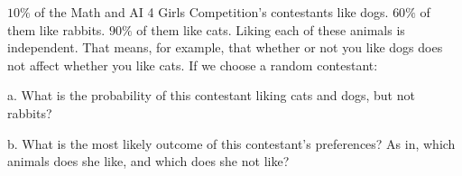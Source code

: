 $10\%$ of the Math and AI 4 Girls Competition's contestants like dogs. $60\%$ of them like rabbits. $90\%$ of them like cats. Liking each of these animals is independent. That means, for example, that whether or not you like dogs does not affect whether you like cats. If we choose a random contestant:

a. What is the probability of this contestant liking cats and dogs, but not rabbits?

b. What is the most likely outcome of this contestant's preferences? As in, which animals does she like, and which does she not like?
